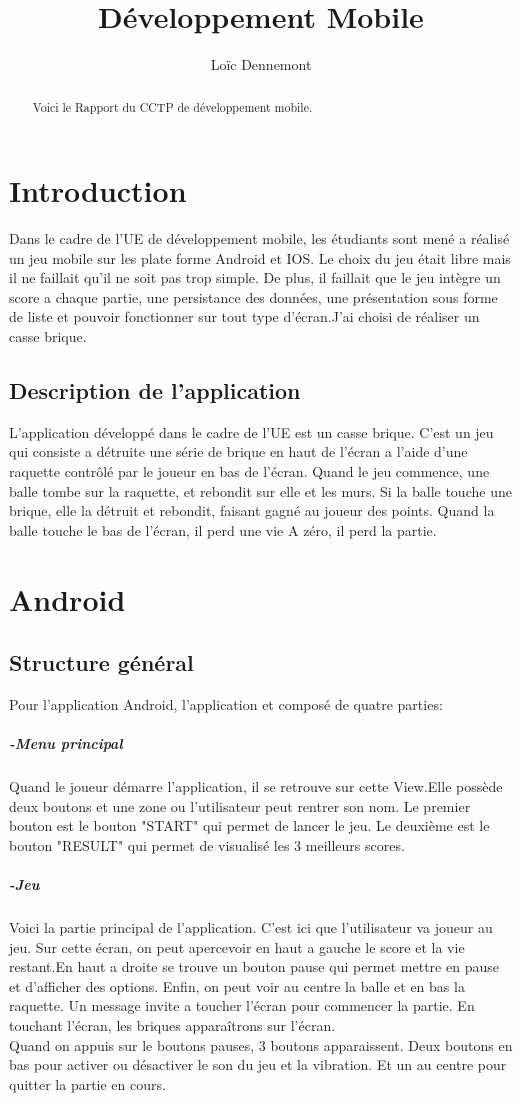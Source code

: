 \documentclass[a4paper]{article}
\title{Développement Mobile}
\author{Loïc Dennemont}
\begin{document}
\maketitle

\begin{abstract}
Voici le Rapport du CCTP de développement mobile.
\end{abstract}

\section{Introduction}
Dans le cadre de l'UE de développement mobile, les étudiants sont mené a réalisé un jeu mobile sur les plate forme Android et IOS. Le choix du jeu était libre mais il ne faillait qu'il ne soit pas trop simple. De plus, il faillait que le jeu intègre un score a chaque partie, une persistance des données, une présentation sous forme de liste et pouvoir fonctionner sur tout type d'écran.J'ai choisi de réaliser un casse brique.
\subsection{Description de l'application}
L'application développé dans le cadre de l'UE est un casse brique. C'est un jeu qui consiste a détruite une série de brique en haut de l'écran a l'aide d'une raquette contrôlé par le joueur en bas de l'écran. Quand le jeu commence, une balle tombe sur la raquette, et rebondit sur elle et les murs. Si la balle touche une brique, elle la détruit et rebondit, faisant gagné au joueur des points. Quand la balle touche le bas de l'écran, il perd une vie A zéro, il perd la partie.

\section{Android} 
\subsection{Structure général}
Pour l'application Android, l'application et composé de quatre parties:
\subparagraph{-Menu principal}
Quand le joueur démarre l'application, il se retrouve sur cette View.Elle possède deux boutons et une zone ou l'utilisateur peut rentrer son nom. Le premier bouton est le bouton "START" qui permet de lancer le jeu. Le deuxième est le bouton "RESULT" qui permet de visualisé les 3 meilleurs scores.
\subparagraph{-Jeu} Voici la partie principal de l'application. C'est ici que l'utilisateur va joueur au jeu. Sur cette écran, on peut apercevoir en haut a gauche le score et la vie restant.En haut a droite se trouve un bouton pause qui permet mettre en pause et d'afficher des options. Enfin, on peut voir au centre la balle et en bas la raquette. Un message invite a toucher l'écran pour commencer la partie. En touchant l'écran, les briques apparaîtrons sur l'écran.\\
Quand on appuis sur le boutons pauses, 3 boutons apparaissent. Deux boutons en bas pour activer ou désactiver le son du jeu et la vibration. Et un au centre pour quitter la partie en cours.
\end{document}
